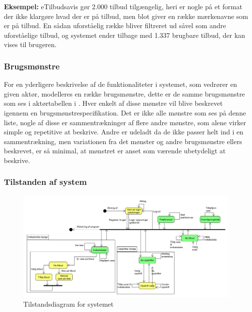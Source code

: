 \textbf{Eksempel:} eTilbudsavis gør 2.000 tilbud tilgængelig, heri er nogle på et format der ikke klargøre hvad der er på tilbud, men blot giver en række mærkenavne som er på tilbud.
En sådan uforståelig række bliver filtreret ud såvel som andre uforståelige tilbud, og systemet ender tilbage med 1.337 brugbare tilbud, der kan vises til brugeren.

\subsubsection*{Brugsmønstre}
For en yderligere beskrivelse af de funktionaliteter i systemet, som vedrører en given aktør, modelleres en række brugsmønstre, dette er de samme brugsmønstre som ses i aktørtabellen i .
Hver enkelt af disse mønstre vil blive beskrevet igennem en brugsmønstrespecifikation.
Det er ikke alle mønstre som ses på denne liste, nogle af disse er sammentrækninger af flere andre mønstre, som alene virker simple og repetitive at beskrive.
Andre er udeladt da de ikke passer helt ind i en sammentrækning, men variationen fra det mønster og andre brugsmønstre ellers beskrevet, er så minimal, at mønstret er anset som værende ubetydeligt at beskrive.



\subsubsection*{Tilstanden af system}
\begin{figure}
	\centering
	\includegraphics[scale=0.6, angle=90]{images/Diagrams/Tilstandsdiagram.PNG}
	\caption{Tilstandsdiagram for systemet}
	\label{tilstandsdiagram}
\end{figure}



